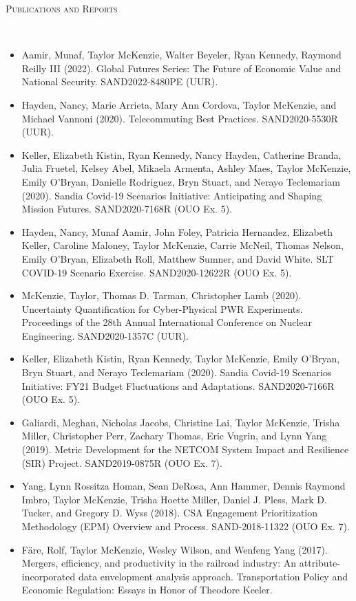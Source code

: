 \documentclass[11pt]{article}
\newenvironment{changemargin}[2]{%
  \begin{list}{}{%
    \setlength{\topsep}{0pt}%
    \setlength{\leftmargin}{#1}%
    \setlength{\rightmargin}{#2}%
    \setlength{\listparindent}{\parindent}%
    \setlength{\itemindent}{\parindent}%
    \setlength{\parsep}{\parskip}%
  }%
  \item[]}{\end{list}
}
\newcommand{\lineover}{
	\begin{changemargin}{-0.05in}{-0.05in}
		\vspace*{-8pt}
		\hrulefill \\
		\vspace*{-2pt}
	\end{changemargin}
}
\newcommand{\header}[1]{
	\begin{changemargin}{-0.5in}{-0.5in}
		\scshape{#1}\\
	\vspace*{-5pt}
  	\lineover
	\end{changemargin}
}
\newenvironment{body} {
	\vspace*{-16pt}
	\begin{changemargin}{-0.25in}{-0.5in}
  }	
	{\end{changemargin}
}
\begin{document}
\smallskip
\vspace*{-5pt}
\header{Publications and Reports}
\begin{body}
\vspace{14pt}
\begin{itemize}
	\item Aamir, Munaf, Taylor McKenzie, Walter Beyeler, Ryan Kennedy, Raymond Reilly III (2022). Global Futures Series: The Future of Economic Value and National Security. SAND2022-8480PE (UUR).
	\item Hayden, Nancy, Marie Arrieta, Mary Ann Cordova, Taylor McKenzie, and Michael Vannoni (2020). Telecommuting Best Practices. SAND2020-5530R (UUR).
	\item Keller, Elizabeth Kistin, Ryan Kennedy, Nancy Hayden, Catherine Branda, Julia Fruetel, Kelsey Abel, Mikaela Armenta, Ashley Maes, Taylor McKenzie, Emily O'Bryan, Danielle Rodriguez, Bryn Stuart, and Nerayo Teclemariam (2020). Sandia Covid-19 Scenarios Initiative: Anticipating and Shaping Mission Futures. SAND2020-7168R (OUO Ex. 5).
	\item Hayden, Nancy, Munaf Aamir, John Foley, Patricia Hernandez, Elizabeth Keller, Caroline Maloney, Taylor McKenzie, Carrie McNeil, Thomas Nelson, Emily O'Bryan, Elizabeth Roll, Matthew Sumner, and David White. SLT COVID-19 Scenario Exercise. SAND2020-12622R (OUO Ex. 5).
	\item McKenzie, Taylor, Thomas D. Tarman, Christopher Lamb (2020). Uncertainty Quantification for Cyber-Physical PWR Experiments. Proceedings of the 28th Annual International Conference on Nuclear Engineering. SAND2020-1357C (UUR).
	\item Keller, Elizabeth Kistin, Ryan Kennedy, Taylor McKenzie, Emily O'Bryan, Bryn Stuart, and Nerayo Teclemariam (2020). Sandia Covid-19 Scenarios Initiative: FY21 Budget Fluctuations and Adaptations. SAND2020-7166R (OUO Ex. 5).
	\item Galiardi, Meghan, Nicholas Jacobs, Christine Lai, Taylor McKenzie, Trisha Miller, Christopher Perr, Zachary Thomas, Eric Vugrin, and Lynn Yang (2019). Metric Development for the NETCOM System Impact and Resilience (SIR) Project. SAND2019-0875R (OUO Ex. 7).
	\item Yang, Lynn Rossitza Homan, Sean DeRosa, Ann Hammer, Dennis Raymond Imbro, Taylor McKenzie, Trisha Hoette Miller, Daniel J. Pless, Mark D. Tucker, and Gregory D. Wyss (2018). CSA Engagement Prioritization Methodology (EPM) Overview and Process. SAND-2018-11322 (OUO Ex. 7).
	\item F\"{a}re, Rolf, Taylor McKenzie, Wesley Wilson, and Wenfeng Yang (2017). Mergers, efficiency, and productivity in the railroad industry: An attribute-incorporated data envelopment analysis approach. Transportation Policy and Economic Regulation: Essays in Honor of Theodore Keeler.

\end{itemize}
\end{body}
\end{document}
